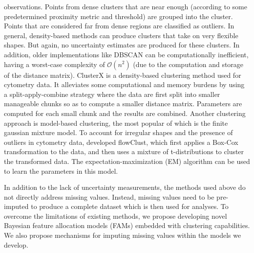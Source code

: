 \documentclass[12pt,]{article}
\begin{document}
observations. Points from dense clusters that are near enough (according to
some predetermined proximity metric and threshold) are grouped into the
cluster. Points that are considered far from dense regions are classified as
outliers. In general, density-based methods can produce clusters that take on
very flexible shapes. But again, no uncertainty estimates are produced for
these clusters. In addition, older implementations like DBSCAN can be
computationally inefficient, having a worst-case complexity of
$\mathcal{O}(n^2)$ (due to the computation and storage of the distance matrix). 
ClusterX \citep{chen2016cytofkit} is a density-based clustering method used for
cytometry data. It alleviates some computational and memory burdens by using a
split-apply-combine strategy where the data are first split into smaller 
manageable chunks so as to compute a smaller distance matrix. Parameters
are computed for each small chunk and the results are combined. 
%
Another clustering approach is model-based clustering, the most popular of
which is the finite gaussian mixture model. To account for irregular shapes and
the presence of outliers in cytometry data, \cite{lo2009flowclust} developed
flowClust, which first applies a Box-Cox transformation to the data, and then
uses a mixture of t-distributions to cluster the transformed data.  The
expectation-maximization (EM) algorithm \citep{dempster1977maximum} can be used
to learn the parameters in this model.
% 

In addition to the lack of uncertainty measurements, the methods used above do
not directly address missing values. Instead, missing values need to be
pre-imputed to produce a complete dataset which is then used for analyses.
%
To overcome the limitations of existing methods, we propose developing novel
Bayesian feature allocation models (FAMs) embedded with clustering
capabilities. We also propose mechanisms for imputing missing values within the
models we develop.
\end{document}

